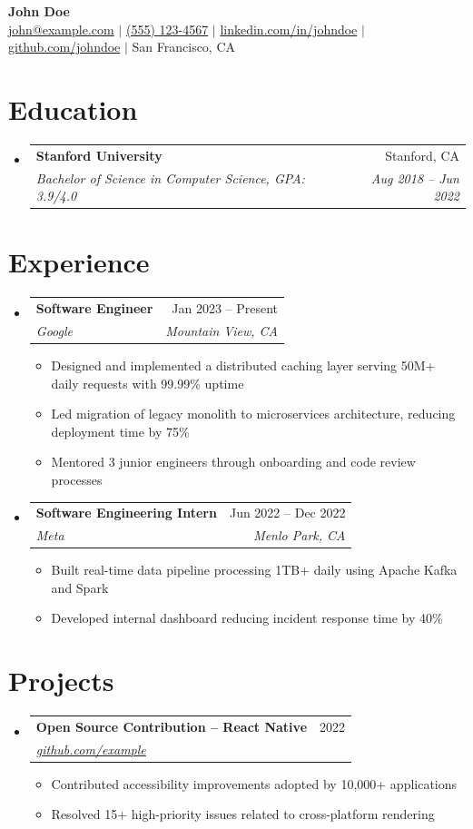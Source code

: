 \documentclass[letterpaper,11pt]{article}
\makeatletter
\newcommand{\resumeItem}[1]{\item\small{#1}}
\newcommand{\resumeSubheading}[4]{
  \item
    \begin{tabular*}{0.97\textwidth}[t]{l@{\extracolsep{\fill}}r}
      \textbf{#1} & \small #2 \\
      \textit{\small #3} & \textit{\small #4} \\
    \end{tabular*}\vspace{-5pt}
}
\makeatother
\begin{document}
\begin{center}
  {\Huge\bfseries John Doe} \\[4pt]
  \small
  \href{mailto:john@example.com}{john@example.com} $|$
  \href{tel:+15551234567}{(555) 123-4567} $|$
  \href{https://linkedin.com/in/johndoe}{linkedin.com/in/johndoe} $|$
  \href{https://github.com/johndoe}{github.com/johndoe} $|$
  San Francisco, CA
\end{center}

\section{Education}
\begin{itemize}[leftmargin=0.15in, label={}]
  \resumeSubheading
    {Stanford University}{Stanford, CA}
    {Bachelor of Science in Computer Science, GPA: 3.9/4.0}{Aug 2018 -- Jun 2022}
\end{itemize}

\section{Experience}
\begin{itemize}[leftmargin=0.15in, label={}]
  \resumeSubheading
    {Software Engineer}{Jan 2023 -- Present}
    {Google}{Mountain View, CA}
    \begin{itemize}
      \resumeItem{Designed and implemented a distributed caching layer serving 50M+ daily requests with 99.99\% uptime}
      \resumeItem{Led migration of legacy monolith to microservices architecture, reducing deployment time by 75\%}
      \resumeItem{Mentored 3 junior engineers through onboarding and code review processes}
    \end{itemize}

  \resumeSubheading
    {Software Engineering Intern}{Jun 2022 -- Dec 2022}
    {Meta}{Menlo Park, CA}
    \begin{itemize}
      \resumeItem{Built real-time data pipeline processing 1TB+ daily using Apache Kafka and Spark}
      \resumeItem{Developed internal dashboard reducing incident response time by 40\%}
    \end{itemize}
\end{itemize}

\section{Projects}
\begin{itemize}[leftmargin=0.15in, label={}]
  \resumeSubheading
    {Open Source Contribution -- React Native}{2022}
    {\href{https://github.com/example}{github.com/example}}{}
    \begin{itemize}
      \resumeItem{Contributed accessibility improvements adopted by 10,000+ applications}
      \resumeItem{Resolved 15+ high-priority issues related to cross-platform rendering}
    \end{itemize}
\end{itemize}
\end{document}
